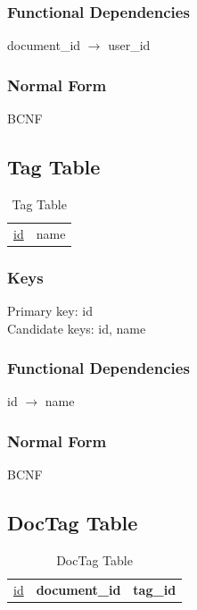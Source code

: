 \documentclass[11pt]{article}
\begin{document}
\subsubsection{Functional Dependencies}
\label{sec-3-9-2}


    document\_id $\rightarrow$ user\_id
\subsubsection{Normal Form}
\label{sec-3-9-3}


    BCNF
\subsection{Tag Table}
\label{sec-3-10}


\begin{table}[htb]
\caption{Tag Table} 
\begin{center}
\begin{tabular}{l|l}
 \underline{id}  &  name  \\
\end{tabular}
\end{center}
\end{table}
\subsubsection{Keys}
\label{sec-3-10-1}

    
    Primary key: id\\
    Candidate keys: id, name
\subsubsection{Functional Dependencies}
\label{sec-3-10-2}


    id $\rightarrow$ name
\subsubsection{Normal Form}
\label{sec-3-10-3}


    BCNF
\subsection{DocTag Table}
\label{sec-3-11}


\begin{table}[htb]
\caption{DocTag Table} 
\begin{center}
\begin{tabular}{l|l|l}
 \underline{id}  &  \textbf{document\_id}  &  \textbf{tag\_id}  \\
\end{tabular}
\end{center}
\end{table}
\end{document}
